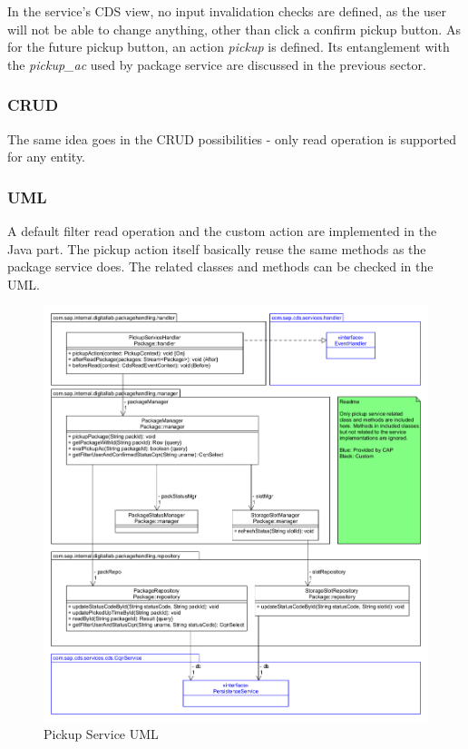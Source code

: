 \bigskip
In the service's CDS view, no input invalidation checks are defined, as the user will not be able to change anything, other than click a confirm pickup button. As for the future pickup button, an action \textit{pickup} is defined. Its entanglement with the \textit{pickup\_ac} used by package service are discussed in the previous sector.

\subsubsection{CRUD}
The same idea goes in the CRUD possibilities - only read operation is supported for any entity.

\subsubsection{UML}

A default filter read operation and the custom action are implemented in the Java part. The pickup action itself basically reuse the same methods as the package service does. The related classes and methods can be checked in the UML. 

\begin{figure}[!h]
    \centering
    \includegraphics[width=1\linewidth]{images/service_class_diagrams/pickup_service_class_diagram.png}
    \caption{Pickup Service UML}
    \label{fig:pickup_service_uml}
\end{figure}
\pagebreak

